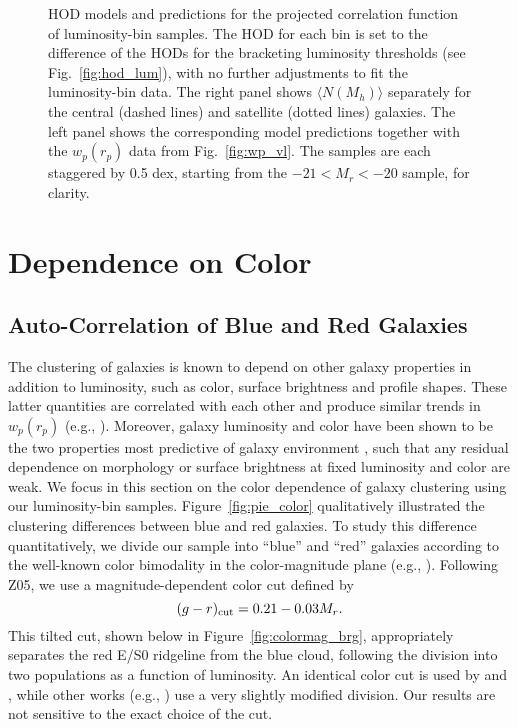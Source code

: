 \documentclass[]{emulateapj}
\def\eg{{e.g.}}
\newcommand{\wrp}{{w_p(r_p)}}
\begin{document}
\begin{figure*}[tbp]
\caption[]{\label{fig:hod_bin}
HOD models and predictions for the projected correlation function of 
luminosity-bin samples. The HOD for each bin is set to the difference of 
the HODs for the bracketing luminosity thresholds (see Fig.~\ref{fig:hod_lum}),
with no further adjustments to fit the luminosity-bin data. The right
panel shows $\langle N(M_h)\rangle$
separately for the central (dashed lines) and 
satellite (dotted lines) galaxies.  The left panel shows the corresponding
model predictions together with the $\wrp$ data from Fig.~\ref{fig:wp_vl}.
The samples are each staggered by 0.5 dex, starting from the $-21<M_r<-20$ 
sample, for clarity.
}
\end{figure*}

\section{Dependence on Color}
\label{sec:color}


\subsection{Auto-Correlation of Blue and Red Galaxies}
\label{subsec:autocol}

The clustering of galaxies is known to depend on other galaxy properties
in addition to luminosity, such as color, surface brightness and profile
shapes. These latter quantities are correlated with each other and produce
similar trends in $w_p(r_p)$ (e.g., \citealt{zehavi02}). Moreover,
galaxy luminosity and color have been shown to be the two properties most
predictive of galaxy environment \citep{blanton05a}, such that any residual
dependence on morphology or surface brightness at fixed luminosity and
color are weak. We focus in this section on the color dependence of
galaxy clustering using our luminosity-bin samples.
Figure~\ref{fig:pie_color}
qualitatively illustrated the clustering differences between blue and
red galaxies. To study this difference quantitatively,
we divide our sample into ``blue''
and ``red'' galaxies according to the well-known color bimodality in the
color-magnitude plane (\eg, \citealt{strateva01,baldry04}).
Following Z05, we use a magnitude-dependent color cut defined by 
\begin{equation}
\label{eq:colcut}
(g-r)_{\rm cut} = 0.21 - 0.03 M_r.
\end{equation}
This tilted cut,
shown below in Figure~\ref{fig:colormag_brg},
appropriately separates the red E/S0 ridgeline from the 
blue cloud, following the division into two populations as a function of
luminosity. 
An identical color cut is used by \citet{swanson08} and \citet{mcbride10}, 
while other works 
(e.g., \citealt{blanton07,skibbasheth09}) use a very slightly modified division. 
Our results are not sensitive to the exact choice of the cut. 
\end{document}
